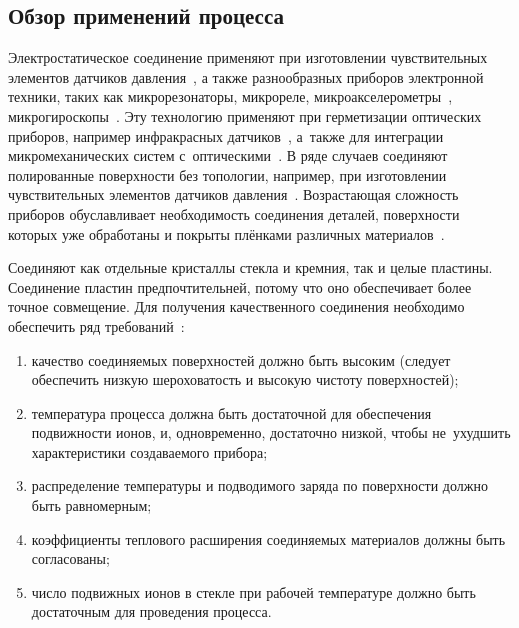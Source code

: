 \subsection{Обзор применений процесса}

Электростатическое соединение применяют при изготовлении чувствительных элементов датчиков давления~\cite{kozin2010_microel_datch_fiz_vel}, а также разнообразных приборов электронной техники, таких как микрорезонаторы, микрореле, микроакселерометры~\cite{lit_Esashi_Wafer2008}, микрогироскопы~\cite{Rogers_current_limited_AB_2005}. Эту технологию применяют при герметизации оптических приборов, например инфракрасных датчиков~\cite{lit_Esashi_Wafer2008}, а~также для интеграции микромеханических систем с~оптическими~\cite{saran2003_ab_opt_fibers}. В ряде случаев соединяют полированные поверхности без топологии, например, при изготовлении чувствительных элементов датчиков давления~\cite{Andreev2013_Analiz_met_elektrostat_svar}. Возрастающая сложность приборов обуславливает необходимость соединения деталей, поверхности которых уже обработаны и покрыты плёнками различных материалов~\cite{Dragoi_cmos_wafer_bonding}.

Соединяют как отдельные кристаллы стекла и кремния, так и целые пластины. Соединение пластин предпочтительней, потому что оно обеспечивает более точное совмещение. Для получения качественного соединения необходимо обеспечить ряд требований~\cite{Low_temp_wafer_AB, Cozma_Puers_1995, Sinev_osoben_primen_inzh_vest201408}:
\begin{enumerate}[label=\asbuk*)]
    \item качество соединяемых поверхностей должно быть высоким (следует обеспечить
    низкую шероховатость и высокую чистоту поверхностей); %
    \item температура процесса должна быть достаточной для обеспечения
    подвижности ионов, и, одновременно, достаточно низкой, чтобы
    не~ухудшить характеристики создаваемого прибора;
    \item распределение температуры и подводимого заряда по
    поверхности должно быть равномерным;
    \item коэффициенты теплового расширения соединяемых материалов
    должны быть согласованы;
    \item число подвижных ионов в стекле при рабочей температуре
    должно быть достаточным для проведения процесса.
\end{enumerate}


